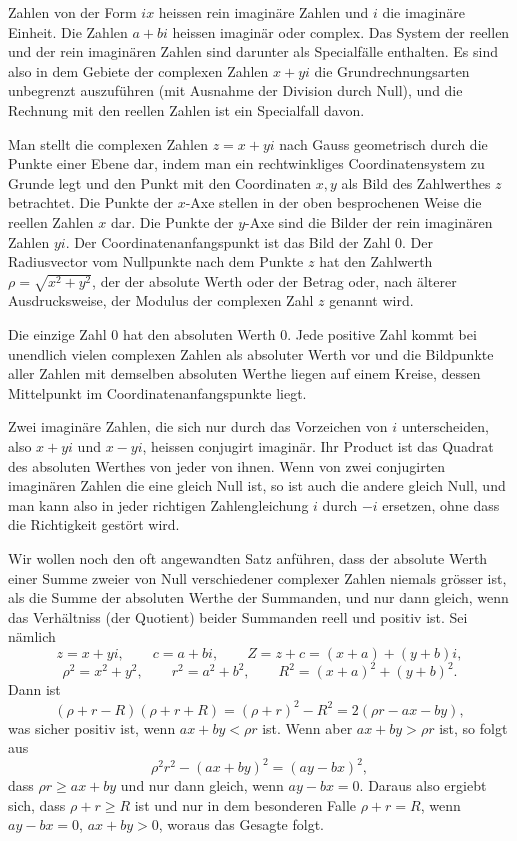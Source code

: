 \documentclass[11pt]{article}
\begin{document}
Zahlen von der Form $ix$ heissen rein imaginäre Zahlen und $i$ die imaginäre Einheit. Die Zahlen $a+bi$ heissen imaginär oder complex. Das System der reellen und der rein imaginären Zahlen sind darunter als Specialfälle enthalten. Es sind also in dem Gebiete der complexen Zahlen $x+yi$ die Grundrechnungsarten unbegrenzt auszuführen (mit Ausnahme der Division durch Null), und die Rechnung mit den reellen Zahlen ist ein Specialfall davon.

Man stellt die complexen Zahlen $z=x+yi$ nach Gauss geometrisch durch die Punkte einer Ebene dar, indem man ein rechtwinkliges Coordinatensystem zu Grunde legt und den Punkt mit den Coordinaten $x,y$ als Bild des Zahlwerthes $z$ betrachtet. Die Punkte der $x$-Axe stellen in der oben besprochenen Weise die reellen Zahlen $x$ dar. Die Punkte der $y$-Axe sind die Bilder der rein imaginären Zahlen $yi$. Der Coordinatenanfangspunkt ist das Bild der Zahl $0$. Der Radiusvector vom Nullpunkte nach dem Punkte $z$ hat den Zahlwerth $\rho=\sqrt{x^2+y^2}$, der der absolute Werth oder der Betrag oder, nach älterer Ausdrucksweise, der Modulus der complexen Zahl $z$ genannt wird.

Die einzige Zahl $0$ hat den absoluten Werth $0$. Jede positive Zahl kommt bei unendlich vielen complexen Zahlen als absoluter Werth vor und die Bildpunkte aller Zahlen mit demselben absoluten Werthe liegen auf einem Kreise, dessen Mittelpunkt im Coordinatenanfangspunkte liegt.

Zwei imaginäre Zahlen, die sich nur durch das Vorzeichen von $i$ unterscheiden, also $x+yi$ und $x-yi$, heissen conjugirt imaginär. Ihr Product ist das Quadrat des absoluten Werthes von jeder von ihnen. Wenn von zwei conjugirten imaginären Zahlen die eine gleich Null ist, so ist auch die andere gleich Null, und man kann also in jeder richtigen Zahlengleichung $i$ durch $-i$ ersetzen, ohne dass die Richtigkeit gestört wird.

Wir wollen noch den oft angewandten Satz anführen, dass der absolute Werth einer Summe zweier von Null verschiedener complexer Zahlen niemals grösser ist, als die Summe der absoluten Werthe der Summanden, und nur dann gleich, wenn das Verhältniss (der Quotient) beider Summanden reell und positiv ist. Sei nämlich
\[
 z=x+yi,
 \qquad c=a+bi,
 \qquad Z=z+c=(x+a)+(y+b)i,
\]
\[
 \rho^2=x^2+y^2,
 \qquad r^2=a^2+b^2,
 \qquad R^2=(x+a)^2+(y+b)^2.
\]
Dann ist
\[
 (\rho+r-R)(\rho+r+R)=(\rho+r)^2-R^2=2(\rho r-ax-by),
\]
was sicher positiv ist, wenn $ax+by<\rho r$ ist. Wenn aber $ax+by>\rho r$ ist, so folgt aus
\[
 \rho^2r^2-(ax+by)^2=(ay-bx)^2,
\]
dass $\rho r\ge ax+by$ und nur dann gleich, wenn $ay-bx=0$. Daraus also ergiebt sich, dass $\rho+r\ge R$ ist und nur in dem besonderen Falle $\rho+r=R$, wenn $ay-bx=0$, $ax+by>0$, woraus das Gesagte folgt.
\end{document}
